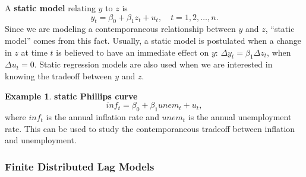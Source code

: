 \documentclass[a4paper, 10pt]{article}
\theoremstyle{definition}	%
\newtheorem{example}{Example}
\begin{document}
A \textbf{static model} relating \( y \) to \( z \) is
\begin{equation}
    y_t = \beta_0 + \beta_1 z_t + u_t, \quad t = 1, 2, \dots, n. \label{p.336,10.1}
\end{equation}
Since we are modeling a contemporaneous relationship between \( y \) and \( z \), ``static model'' comes from this fact. Usually, a static model is postulated when a change in \( z \) at time \( t \) is believed to have an immediate effect on \( y \): \( \Delta y_t = \beta_1 \Delta z_t \), when \( \Delta u_t = 0 \). Static regression models are also used when we are interested in knowing the tradeoff between \( y \) and \( z \). 
\begin{example}
    \textbf{static Phillips curve}
        \begin{equation}
            inf_t = \beta_0 + \beta_1 unem_t + u_t, \label{p.336,10.2}
        \end{equation}
    where \( inf_t \) is the annual inflation rate and \( unem_t \) is the annual unemployment rate.
    This can be used to study the contemporaneous tradeoff between inflation and unemployment.
\end{example}

\subsubsection{Finite Distributed Lag Models}
\end{document}
